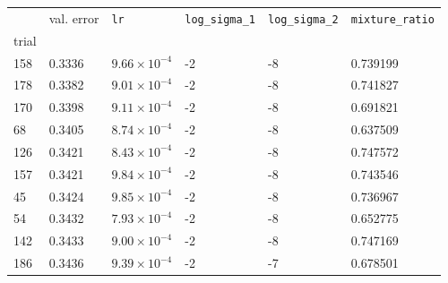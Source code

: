 \begin{tabular}{lp{2.3cm}p{2.3cm}p{2.3cm}p{2.3cm}p{2.3cm}}
\toprule
{} &  val. error &         \texttt{lr} &  \texttt{log\_sigma\_1} &  \texttt{log\_sigma\_2} &  \texttt{mixture\_ratio} \\
trial &             &                     &                         &                         &                          \\
\midrule
158   &      0.3336 & $9.66\times10^{-4}$ &                      -2 &                      -8 &                 0.739199 \\
178   &      0.3382 & $9.01\times10^{-4}$ &                      -2 &                      -8 &                 0.741827 \\
170   &      0.3398 & $9.11\times10^{-4}$ &                      -2 &                      -8 &                 0.691821 \\
68    &      0.3405 & $8.74\times10^{-4}$ &                      -2 &                      -8 &                 0.637509 \\
126   &      0.3421 & $8.43\times10^{-4}$ &                      -2 &                      -8 &                 0.747572 \\
157   &      0.3421 & $9.84\times10^{-4}$ &                      -2 &                      -8 &                 0.743546 \\
45    &      0.3424 & $9.85\times10^{-4}$ &                      -2 &                      -8 &                 0.736967 \\
54    &      0.3432 & $7.93\times10^{-4}$ &                      -2 &                      -8 &                 0.652775 \\
142   &      0.3433 & $9.00\times10^{-4}$ &                      -2 &                      -8 &                 0.747169 \\
186   &      0.3436 & $9.39\times10^{-4}$ &                      -2 &                      -7 &                 0.678501 \\
\bottomrule
\end{tabular}
